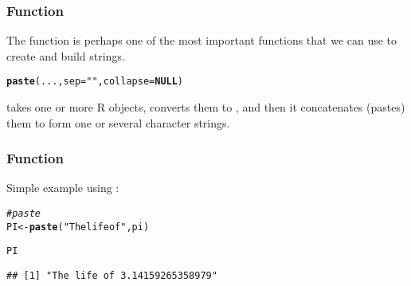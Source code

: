 \documentclass[12pt]{beamer}\usepackage[]{graphicx}\usepackage[]{color}
\makeatletter
\newcommand{\hlstr}[1]{\textcolor[rgb]{0.192,0.494,0.8}{#1}}%
\newcommand{\hlcom}[1]{\textcolor[rgb]{0.678,0.584,0.686}{\textit{#1}}}%
\newcommand{\hlstd}[1]{\textcolor[rgb]{0.345,0.345,0.345}{#1}}%
\newcommand{\hlkwa}[1]{\textcolor[rgb]{0.161,0.373,0.58}{\textbf{#1}}}%
\newcommand{\hlkwb}[1]{\textcolor[rgb]{0.69,0.353,0.396}{#1}}%
\newcommand{\hlkwc}[1]{\textcolor[rgb]{0.333,0.667,0.333}{#1}}%
\newcommand{\hlkwd}[1]{\textcolor[rgb]{0.737,0.353,0.396}{\textbf{#1}}}%
\newenvironment{kframe}{%
 \def\at@end@of@kframe{}%
 \ifinner\ifhmode%
  \def\at@end@of@kframe{\end{minipage}}%
  \begin{minipage}{\columnwidth}%
 \fi\fi%
 \def\FrameCommand##1{\hskip\@totalleftmargin \hskip-\fboxsep
 \colorbox{shadecolor}{##1}\hskip-\fboxsep
     \hskip-\linewidth \hskip-\@totalleftmargin \hskip\columnwidth}%
 \MakeFramed {\advance\hsize-\width
   \@totalleftmargin\z@ \linewidth\hsize
   \@setminipage}}%
 {\par\unskip\endMakeFramed%
 \at@end@of@kframe}
\newenvironment{knitrout}{}{} %
\makeatother
\begin{document}

\begin{frame}[fragile]
\frametitle{Function }

The function {\hilit {}} is perhaps one of the most important functions that we can use to create and build strings. 

\begin{knitrout}\footnotesize
{}\color{fgcolor}\begin{kframe}
\begin{alltt}
\hlkwd{paste}\hlstd{(...,} \hlkwc{sep} \hlstd{=} \hlstr{" "}\hlstd{,} \hlkwc{collapse} \hlstd{=} \hlkwa{NULL}\hlstd{)}
\end{alltt}
\end{kframe}
\end{knitrout}

 takes one or more R objects, converts them to , and then it concatenates (pastes) them to form one or several character strings.

\end{frame}


\begin{frame}[fragile]
\frametitle{Function }

Simple example using :
\begin{knitrout}\footnotesize
{}\color{fgcolor}\begin{kframe}
\begin{alltt}
\hlcom{# paste}
\hlstd{PI} \hlkwb{<-} \hlkwd{paste}\hlstd{(}\hlstr{"The life of"}\hlstd{, pi)}

\hlstd{PI}
\end{alltt}
\begin{verbatim}
## [1] "The life of 3.14159265358979"
\end{verbatim}
\end{kframe}
\end{knitrout}

\end{frame}

\end{document}
